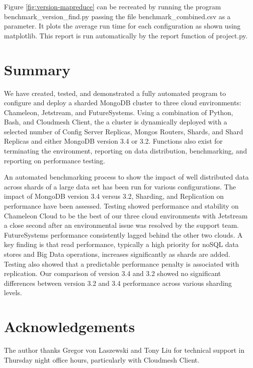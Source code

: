 \documentclass[9pt,twocolumn,twoside]{../../styles/osajnl}
\begin{document}
Figure \ref{fig:version-mapreduce} can be recreated by running the
program benchmark\_version\_find.py passing the file
benchmark\_combined.csv as a parameter. It plots the average run time
for each configuration as shown using matplotlib. This report is run
automatically by the report function of project.py.



\section{Summary}

We have created, tested, and demonstrated a fully automated program to
configure and deploy a sharded MongoDB cluster to three cloud
environments: Chameleon, Jetstream, and FutureSystems. Using a
combination of Python, Bash, and Cloudmesh Client, the a cluster is
dynamically deployed with a selected number of Config Server Replicas,
Mongos Routers, Shards, and Shard Replicas and either MongoDB version
3.4 or 3.2. Functions also exist for terminating the environment,
reporting on data distribution, benchmarking, and reporting on
performance testing.

An automated benchmarking process to show the impact of well
distributed data across shards of a large data set has been run for
various configurations. The impact of MongoDB version 3.4 versus 3.2,
Sharding, and Replication on performance have been assessed. Testing
showed performance and stability on Chameleon Cloud to be the best of
our three cloud environments with Jetstream a close second after an
environmental issue was resolved by the support team. FutureSystems
performance consistently lagged behind the other two clouds. A key
finding is that read performance, typically a high priority for noSQL
data stores and Big Data operations, increases significantly as shards
are added. Testing also showed that a predictable performance penalty
is associated with replication. Our comparison of version 3.4 and 3.2
showed no significant differences between version 3.2 and 3.4
performance across various sharding levels.

\section*{Acknowledgements}

The author thanks Gregor von Laszewski and Tony Liu for technical
support in Thursday night office hours, particularly with Cloudmesh
Client.


\end{document}
